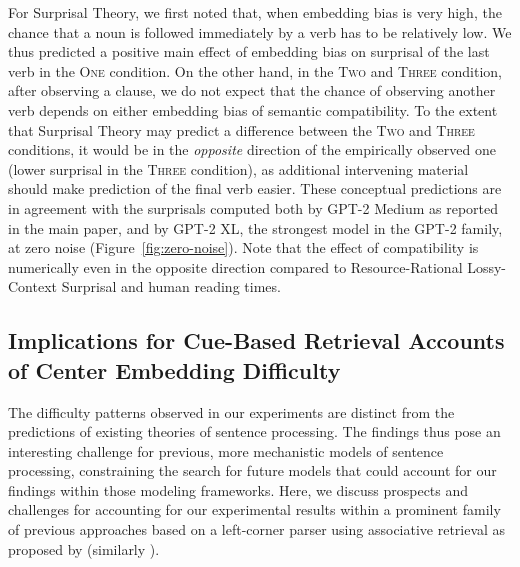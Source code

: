 For Surprisal Theory, we first noted that, when embedding bias is very high, the chance that a noun is followed immediately by a verb has to be relatively low.
We thus predicted a positive main effect of embedding bias on surprisal of the last verb in the \textsc{One} condition.
On the other hand, in the \textsc{Two} and \textsc{Three} condition, after observing a clause, we do not expect that the chance of observing another verb depends on either embedding bias of semantic compatibility.
To the extent that Surprisal Theory may predict a difference between the \textsc{Two} and \textsc{Three} conditions, it would be in the \emph{opposite} direction of the empirically observed one (lower surprisal in the \textsc{Three} condition), as additional intervening material should make prediction of the final verb easier.
These conceptual predictions are in agreement with the surprisals computed both by GPT-2 Medium as reported in the main paper, and by GPT-2 XL, the strongest model in the GPT-2 family, at zero noise (Figure~\ref{fig:zero-noise}).
Note that the effect of compatibility is numerically even in the opposite direction compared to Resource-Rational Lossy-Context Surprisal and human reading times. 

\subsection{Implications for Cue-Based Retrieval Accounts of Center Embedding Difficulty}\label{sec:surface-strings}


The difficulty patterns observed in our experiments are distinct from the predictions of existing theories of sentence processing.
The findings thus pose an interesting challenge for previous, more mechanistic models of sentence processing, constraining the search for future models that could account for our findings within those modeling frameworks.
Here, we discuss prospects and challenges for accounting for our experimental results within a prominent family of previous approaches based on a left-corner parser using associative retrieval as proposed by \citet{lewis2005activation} (similarly \citet{Rasmussen2018LeftCornerPW, Dotlacil2020Parsing}).


